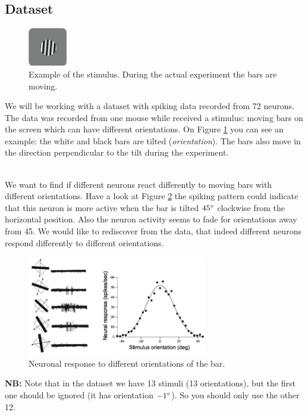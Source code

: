 \documentclass[a4paper,11pt]{article}
\begin{document}
\subsection{Dataset}

\begin{figure}
	\centering
	\vspace{-12pt}
	\includegraphics[width=0.15\textwidth]{orientationstimulus.jpg}
	\caption{Example of the stimulus. During the actual experiment the bars are moving.}
	\label{fig:stimulusexample}
	\vspace{-5pt}
\end{figure}


We will be working with a dataset with spiking data recorded from 72 neurons. The data was recorded from one mouse while received a stimulus: moving bars on the screen which can have different orientations. On Figure \ref{fig:stimulusexample} you can see an example: the white and black bars are tilted (\emph{orientation}). The bars also move in the direction perpendicular to the tilt during the experiment. 

\ \\
We want to find if different neurons react differently to moving bars with different orientations. Have a look at Figure \ref{fig:orientationresponse} the spiking pattern could indicate that this neuron is more active when the bar is tilted $45\degree$ clockwise from the horizontal position. Also the neuron activity seems to fade for orientations away from 45. We would like to rediscover from the data, that indeed different neurons respond differently to different orientations.

\begin{figure}[H]
	\centering
	\includegraphics[width=0.7\textwidth]{orientation.jpg} 
	\caption{Neuronal response to different orientations of the bar.}
	\label{fig:orientationresponse}
\end{figure}
\textbf{NB:} Note that in the dataset we have 13 stimuli (13 orientations), but the first one should be ignored (it has orientation $-1\degree$). So you should only use the other 12.
\end{document}
